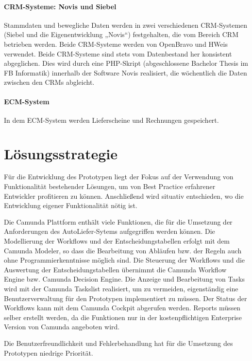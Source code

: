 \paragraph{CRM-Systeme: Novis und Siebel}

Stammdaten und bewegliche Daten werden in zwei verschiedenen CRM-Systemen (Siebel und die Eigenentwicklung „Novis“) festgehalten, die vom Bereich CRM betrieben werden. Beide CRM-Systeme werden von OpenBravo und HWeis verwendet. Beide CRM-Systeme sind stets vom Datenbestand her konsistent abgeglichen. Dies wird durch eine PHP-Skript (abgeschlossene Bachelor Thesis im FB Informatik) innerhalb der Software Novis realisiert, die wöchentlich die Daten zwischen den CRMs abgleicht.

\paragraph{ECM-System}

In dem ECM-System werden Lieferscheine und Rechnungen gespeichert. %

\section{Lösungsstrategie}\label{section-solution-strategy}

Für die Entwicklung des Prototypen liegt der Fokus auf der Verwendung von Funktionalität bestehender Lösungen, um von Best Practice erfahrener Entwickler profitieren zu können. Anschließend wird situativ entschieden, wo die Entwicklung eigener Funktionalität nötig ist.

Die Camunda Plattform enthält viele Funktionen, die für die Umsetzung der Anforderungen des AutoLiefer-Sytems aufgegriffen werden können. Die Modellierung der Workflows und der Entscheidungstabellen erfolgt mit dem Camunda Modeler, so dass die Bearbeitung von Abläufen bzw. der Regeln auch ohne Programmierkenntnisse möglich sind. Die Steuerung der Workflows und die Auswertung der Entscheidungstabellen übernimmt die Camunda Workflow Engine bzw. Camunda Decision Engine. Die Anzeige und Bearbeitung von Tasks wird mit der Camunda Taskslist realisiert, um zu vermeiden, eigenständig eine Benutzerverwaltung für den Prototypen implementiert zu müssen. Der Status der Workflows kann mit dem Camunda Cockpit abgerufen werden. Reports müssen selber erstellt werden, da die Funktionen nur in der kostenpflichtigen Enterprise Version von Camunda angeboten wird.

Die Benutzerfreundlichkeit und Fehlerbehandlung hat für die Umsetzung des Prototypen niedrige Priorität.

